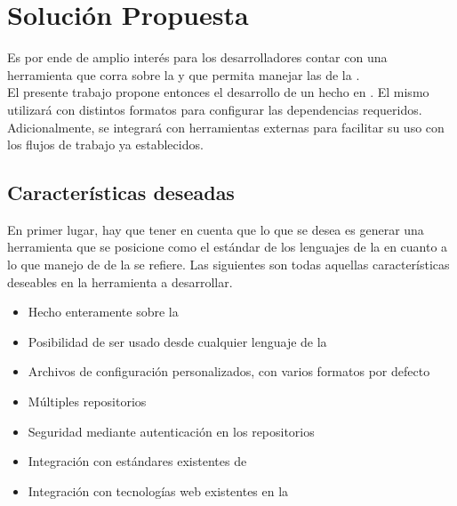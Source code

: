 \section{Solución Propuesta}
\label{sec:solution}

Es por ende de amplio interés para los desarrolladores contar con una 
herramienta que corra sobre la \jvm y que permita manejar las \dependencies de 
la \viewtier.\\
El presente trabajo propone entonces el desarrollo de un \depmgr hecho en 
\scala. El mismo utilizará \conffiles con distintos formatos para configurar 
las dependencias requeridos. Adicionalmente, se integrará con herramientas 
externas para facilitar su uso con los flujos de trabajo ya establecidos.\\

\subsection{Características deseadas}
\label{subsec:solution:whishlist}

En primer lugar, hay que tener en cuenta que lo que se desea es generar una 
herramienta que se posicione como el estándar de los lenguajes de la \jvm en 
cuanto a lo que manejo de \dependencies de la \viewtier se refiere. Las 
siguientes son todas aquellas características deseables en la herramienta a 
desarrollar.

\begin{itemize}
	\setlength{\itemsep}{1pt}
	\setlength{\parskip}{0pt}
	\setlength{\parsep}{0pt}
	\item Hecho enteramente sobre la \jvm
	\item Posibilidad de ser usado desde cualquier lenguaje de 
	la \jvm
	\item Archivos de configuración personalizados, con varios 
	formatos por defecto
	\item Múltiples repositorios
	\item Seguridad mediante autenticación en los repositorios
	\item Integración con estándares existentes de \depmgrs
	\item Integración con tecnologías web existentes en la \jvm
\end{itemize}

